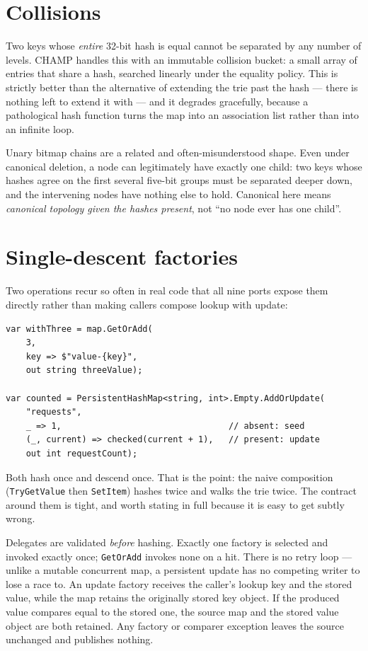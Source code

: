 \documentclass[11pt,twoside,openright]{book}
\newcommand{\code}[1]{\texorpdfstring{\textcolor{d7ink}{\texttt{#1}}}{#1}}
\begin{document}
\section{Collisions}

Two keys whose \emph{entire} 32-bit hash is equal cannot be separated by any
number of levels. CHAMP handles this with an immutable collision bucket: a small
array of entries that share a hash, searched linearly under the equality policy.
This is strictly better than the alternative of extending the trie past the hash
--- there is nothing left to extend it with --- and it degrades gracefully,
because a pathological hash function turns the map into an association list
rather than into an infinite loop.

Unary bitmap chains are a related and often-misunderstood shape. Even under
canonical deletion, a node can legitimately have exactly one child: two keys
whose hashes agree on the first several five-bit groups must be separated deeper
down, and the intervening nodes have nothing else to hold. Canonical here means
\emph{canonical topology given the hashes present}, not ``no node ever has one
child''.

\section{Single-descent factories}

Two operations recur so often in real code that all nine ports expose them
directly rather than making callers compose lookup with update:

\begin{lstlisting}[language={[Sharp]C}]
var withThree = map.GetOrAdd(
    3,
    key => $"value-{key}",
    out string threeValue);

var counted = PersistentHashMap<string, int>.Empty.AddOrUpdate(
    "requests",
    _ => 1,                                 // absent: seed
    (_, current) => checked(current + 1),   // present: update
    out int requestCount);
\end{lstlisting}

Both hash once and descend once. That is the point: the naive composition
(\code{TryGetValue} then \code{SetItem}) hashes twice and walks the trie twice.
The contract around them is tight, and worth stating in full because it is easy
to get subtly wrong.

\begin{contractbox}
Delegates are validated \emph{before} hashing. Exactly one factory is selected
and invoked exactly once; \code{GetOrAdd} invokes none on a hit. There is no
retry loop --- unlike a mutable concurrent map, a persistent update has no
competing writer to lose a race to. An update factory receives the caller's
lookup key and the stored value, while the map retains the originally stored key
object. If the produced value compares equal to the stored one, the source map
and the stored value object are both retained. Any factory or comparer exception
leaves the source unchanged and publishes nothing.
\end{contractbox}
\end{document}
